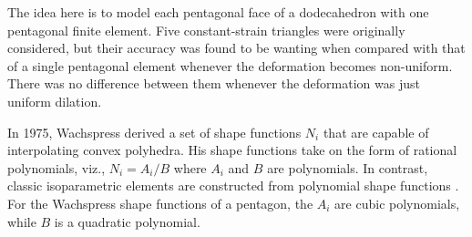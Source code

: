 The idea here is to model each pentagonal face of a dodecahedron with one pentagonal finite element.  Five constant-strain triangles were originally considered, but their accuracy was found to be wanting when compared with that of a single pentagonal element whenever the deformation becomes non-uniform.  There was no difference between them whenever the deformation was just uniform dilation.

In 1975, Wachspress \cite{Wachspress75,Wachspress16} derived a set of shape functions $N_i$ that are capable of interpolating convex polyhedra.  His shape functions take on the form of rational polynomials, viz., $N_i = A_i / B$ where $A_i$ and $B$ are polynomials.  In contrast, classic isoparametric elements are constructed from polynomial shape functions \cite{Hughes87}.  For the Wachspress shape functions of a pentagon, the $A_i$ are cubic polynomials, while $B$ is a quadratic polynomial.

